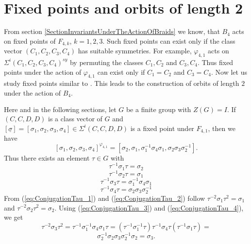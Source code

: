 \documentclass[12pt,a4paper]{article}
\numberwithin{equation}{section}
\numberwithin{table}{section}
\begin{document}
\section{Fixed points and orbits of length 2}\label{SectionFixedPointsAndOrbitsOfSize2}

From section \ref{SectionInvariantsUnderTheActionOfBraids} we know, that $B_4$ acts on fixed points of $F_{4,k}$, $k=1,2,3$.
Such fixed points can exist only if the class vector $(C_1,C_2,C_3,C_4)$ has suitable symmetries. 
For example, $\varphi_{4,1}$ acts on $\Sigma^i(C_1,C_2,C_3,C_4)^{sy}$ by permuting the classes $C_1,C_2$ and $C_3,C_4$.
Thus fixed points under the action of $\varphi_{4,1}$ can exist only if $C_1 = C_2$ and $C_3 = C_4$.
Now let us study fixed points similar to \cite[III, §2, Satz 5(b)]{RefMat1987}. This leads to the construction
of orbits of length $2$ under the action of $B_4$.
\par
\noindent
Here and in the following sections, let $G$ be a finite group with $Z(G)=I$.
If $(C,C,D,D)$ is a class vector of $G$ and $[\underline{\sigma}]=[\sigma_1,\sigma_2,\sigma_3,\sigma_4] \in \Sigma^i(C,C,D,D)$
is a fixed point under $F_{4,1}$, then we have
$$[\sigma_1,\sigma_2,\sigma_3,\sigma_4]^{\varphi_{4,1}} = 
[\sigma_2,\sigma_1,\sigma^{-1}_1 \sigma_4 \sigma_1, \sigma_2 \sigma_3 \sigma^{-1}_2].$$
Thus there exists an element $\tau \in G$ with
\begin{equation} 
\label{eq:ConjugationTau_1}
\tau^{-1} \sigma_1 \tau = \sigma_2
\end{equation}
\begin{equation}
\label{eq:ConjugationTau_2}
\tau^{-1} \sigma_2 \tau = \sigma_1
\end{equation}
\begin{equation}
\label{eq:ConjugationTau_3}
\tau^{-1} \sigma_3 \tau = \sigma^{-1}_1 \sigma_4 \sigma_1
\end{equation}
\begin{equation}
\label{eq:ConjugationTau_4}
\tau^{-1} \sigma_4 \tau = \sigma_2 \sigma_3 \sigma^{-1}_2
\end{equation}
From (\ref{eq:ConjugationTau_1}) and (\ref{eq:ConjugationTau_2}) follow $\tau^{-2} \sigma_1 \tau^2 = \sigma_1$
and $\tau^{-2} \sigma_2 \tau^2 = \sigma_2$.
Using (\ref{eq:ConjugationTau_3}) and (\ref{eq:ConjugationTau_4}), we get
$$\tau^{-2} \sigma_3 \tau^2 = \tau^{-1} \sigma^{-1}_1 \sigma_4 \sigma_1 \tau = 
(\tau^{-1} \sigma^{-1}_1 \tau)\tau^{-1} \sigma_4 \tau (\tau^{-1} \sigma_1 \tau) =$$
$$\sigma^{-1}_2 \sigma_2 \sigma_3 \sigma^{-1}_2 \sigma_2 = \sigma_3.$$
\end{document}
